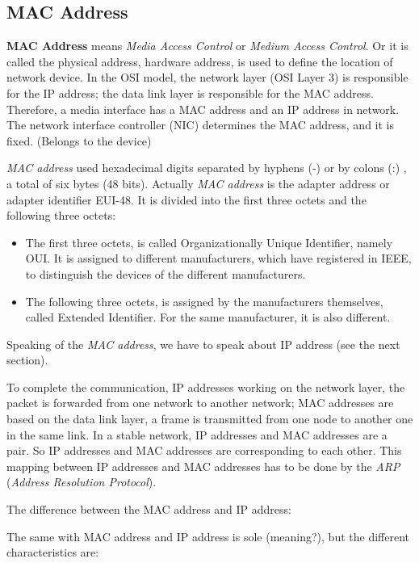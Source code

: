 \subsection{MAC Address}

\textbf{MAC Address} means \textit{Media Access Control} or \textit{Medium Access Control}. Or it is called the physical address, hardware address, is used to define the location of network device. In the OSI model, the network layer (OSI Layer 3) is responsible for the IP address; the data link layer is responsible for the MAC address. Therefore, a media interface has a MAC address and an IP address in network. The network interface controller (NIC) determines the MAC address, and it is fixed. (Belongs to the device)  

\textit{MAC address} used hexadecimal digits separated by hyphens (-) or by colons (:) , a total of six bytes (48 bits). Actually \textit{MAC address} is the adapter address or adapter identifier EUI-48. It is divided into the first three octets and the following three octets:  

\begin{itemize}
	\item The first three octets, is called Organizationally Unique Identifier, namely OUI. It is assigned to different manufacturers, which have registered in IEEE, to distinguish the devices of the different manufacturers.
	\item The following three octets, is assigned by the manufacturers themselves, called Extended Identifier. For the same manufacturer, it is also different.
\end{itemize}

Speaking of the \textit{MAC address}, we have to speak about IP address (see the next section).

To complete the communication, IP addresses working on the network layer, the packet is forwarded from one network to another network; MAC addresses are based on the data link layer, a frame is transmitted from one node to another one in the same link. In a stable network, IP addresses and MAC addresses are a pair. So IP addresses and MAC addresses are corresponding to each other. This mapping between IP addresses and MAC addresses has to be done by the \textit{ARP} (\textit{Address Resolution Protocol}).  

The difference between the MAC address and IP address:  

The same with MAC address and IP address is sole (meaning?), but the different characteristics are:  

